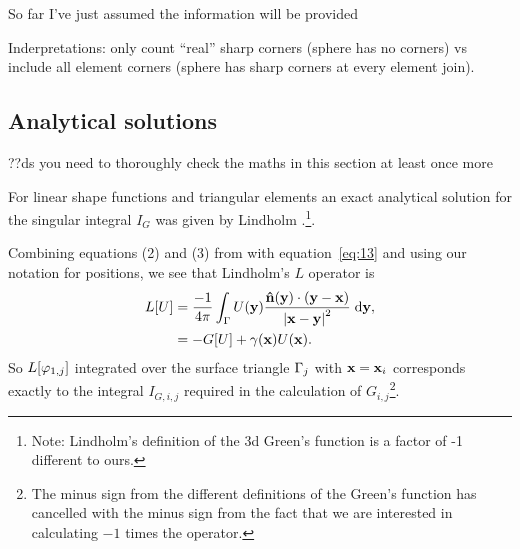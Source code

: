 So far I've just assumed the information will be provided

Inderpretations: only count ``real'' sharp corners (\ie sphere has no corners) vs include all element corners (\ie sphere has sharp corners at every element join).


\subsection{Analytical solutions}

??ds you need to thoroughly check the maths in this section at least once more

For linear shape functions and triangular elements an exact analytical solution for the singular integral $I_G$ was given by Lindholm \cite[App. B]{Lindholm1984}.\footnote{Note: Lindholm's definition of the 3d Green's function is a factor of -1 different to ours.}.

Combining equations (2) and (3) from \cite{Lindholm1984} with equation~\eqref{eq:13} and using our notation for positions, we see that Lindholm's $L$ operator is
\begin{equation}
  \begin{aligned}
    L[U] &= \frac{-1}{4 \pi}\int_{\Gamma} U(\mathbf{y}) \frac{\mathbf{\hat{n}}(\mathbf{y}) \cdot (\mathbf{y} -
      \mathbf{x})}{\left|{\mathbf{x} - \mathbf{y}} \right|^2}
    {\; \text{d}}\mathbf{y}, \\
    &= -G[U] + \gamma(\mathbf{x}) U(\mathbf{x}).
  \end{aligned}
\end{equation}
So $L[\varphi_{1,{j}}]$ integrated over the surface triangle ${\Gamma}_{j}$ with $\mathbf{x} = \mathbf{x}_{i}$ corresponds exactly to the integral $I_{G,i,j}$ required in the calculation of $G_{i,j}$\footnote{The minus sign from the different definitions of the Green's function has cancelled with the minus sign from the fact that we are interested in calculating $-1$ times the operator.}.

